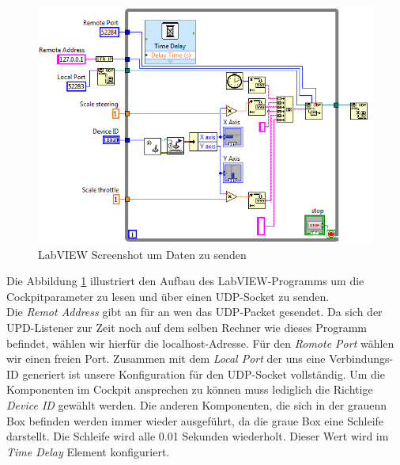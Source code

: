 \begin{figure}[H]
\centering 
\includegraphics[width=1\linewidth]{src/labview_screenshot_videoplayer_daten_senden.png}
\caption{LabVIEW Screenshot um Daten zu senden} %
\label{labview_screenshot_videoplayer_daten_senden} %
\end{figure}
Die Abbildung \ref{labview_screenshot_videoplayer_daten_senden} illustriert den Aufbau des LabVIEW-Programms um die Cockpitparameter zu lesen und über einen UDP-Socket zu senden.\\
Die \textit{Remot Address} gibt an für an wen das UDP-Packet gesendet. Da sich der UPD-Listener zur Zeit noch auf dem selben Rechner wie dieses Programm befindet, wählen wir hierfür die localhost-Adresse. Für den \textit{Romote Port} wählen wir einen freien Port. Zusammen mit dem \textit{Local Port} der uns eine Verbindungs-ID generiert ist unsere Konfiguration für den UDP-Socket vollständig. Um die Komponenten im Cockpit ansprechen zu können muss lediglich die Richtige \textit{Device ID} gewählt werden. Die anderen Komponenten, die sich in der grauenn Box befinden werden immer wieder ausgeführt, da die graue Box eine Schleife darstellt. Die Schleife wird alle 0.01 Sekunden wiederholt. Dieser Wert wird im \textit{Time Delay} Element konfiguriert. \\

